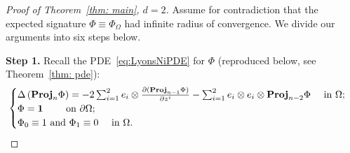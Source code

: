 \documentclass[11pt,a4paper,english,reqno]{amsart}
\theoremstyle{plain}
\newcommand{\p}{\partial}
\newcommand{\1}{\mathbbm{1}}
\newcommand{\A}{{\mathscr{A}}}
\newcommand{\proj}{\mathbf{Proj}}
\begin{document}
\begin{proof}[Proof of Theorem~\ref{thm: main}, $d=2$]



Assume for contradiction that the expected signature $\Phi\equiv\Phi_{\Omega}$ had infinite radius of convergence. We divide our arguments into six steps below.

\smallskip
\noindent
{\bf Step 1.}  Recall the PDE~\eqref{eq:LyonsNiPDE} for $\Phi$ (reproduced below, see Theorem~\ref{thm: pde}):
\begin{equation}\label{PDE, general domain}
 \begin{cases}
    \Delta \left( \proj_{n}\Phi\right) = -2 \sum_{i=1}^2 e_i \otimes \frac{\p ( \proj_{n-1}\Phi)}{\p z^i}- \sum_{i=1}^2 e_i \otimes e_i \otimes\proj_{n-2}\Phi\quad\text{ in }\Omega;\\
\Phi = {\bf 1}  \qquad \text{ on } \p\Omega;\\
    \Phi_0 \equiv 1  \text{ and } \Phi_{1} \equiv 0\quad\text{ in }\Omega.
    \end{cases}
\end{equation}







\end{proof}
\end{document}
